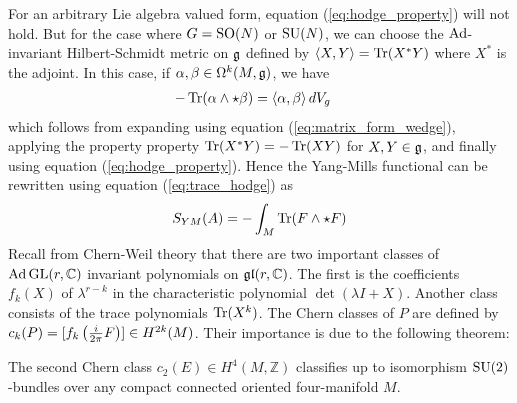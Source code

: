 For an arbitrary Lie algebra valued form, equation (\ref{eq:hodge_property})
will not hold. But for the case where $G=\operatorname{SO}(N)$ or  $\operatorname{SU}(N)$, we can choose the
$\operatorname{Ad}$-invariant Hilbert-Schmidt metric on $\operatorname{\mathfrak{g}}$ defined by
$\gen{X,Y}=\Tr(X^*Y)$ where $X^*$ is the adjoint. 
In this case, if $\alpha,\beta \in \Omega^k(M,\operatorname{\mathfrak{g}})$, we have 
\begin{align} 
	-\Tr(\alpha \wedge \star \beta)
	&= \gen{\alpha,\beta}dV_g \label{eq:trace_hodge}
\end{align} 
which follows from expanding using equation (\ref{eq:matrix_form_wedge}),
applying the property property $\operatorname{Tr}(X^*Y)=-\operatorname{Tr}(XY)$ for $X,Y\in\operatorname{\mathfrak{g}}$, and
finally using equation (\ref{eq:hodge_property}). 
Hence the Yang-Mills functional can be rewritten using equation (\ref{eq:trace_hodge}) as
\[
	S_{YM}(A) 
	=-\int_M \operatorname{Tr} (F\wedge \star F) 
\] 
\noindent
Recall from Chern-Weil theory that there are two important classes of
$\operatorname{Ad} \operatorname{GL}(r,\mathbb{C})$ invariant polynomials on $\operatorname{\mathfrak{gl}}(r,\mathbb{C})$. 
The first is the coefficients $f_k(X)$ of $\lambda^{r-k}$ in the characteristic
polynomial $\det(\lambda I + X)$. Another class consists of the trace
polynomials $\operatorname{Tr}(X^k)$. 
The Chern classes of $P$ are defined by $c_k(P) =
[f_k\paren{\frac{i}{2\pi}F}] \in H^{2k}(M)$. Their importance is due to the
following theorem:
\begin{thm}
	The second Chern class $c_2(E)\in H^4(M,\mathbb{Z})$ classifies up to
	isomorphism $\operatorname{SU}(2)$-bundles over any compact connected oriented 
	four-manifold $M$. 
\end{thm}

